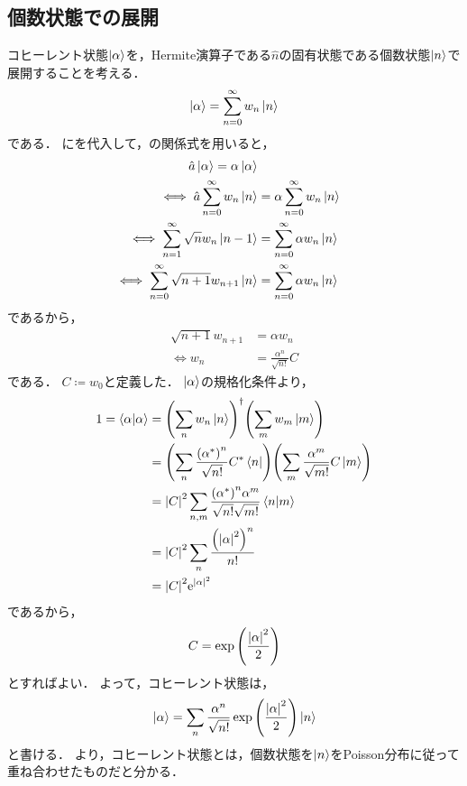 \documentclass{report}
\begin{document}
  \subsection{個数状態での展開}
    コヒーレント状態$\ket{\alpha}$を，Hermite演算子である$\hat{n}$の固有状態である個数状態$\ket{n}$で展開することを考える．
    \begin{align}
      \ket{\alpha} = \sum_{n = 0}^{\infty}w_n\ket{n}\label{coherent-expantion}
    \end{align}
    である．
    にを代入して，の関係式を用いると，
    \begin{align}
      \hat{a}\ket{\alpha} = \alpha\ket{\alpha} \\ 
      \iff \hat{a}\sum_{n = 0}^{\infty}w_n\ket{n} &= \alpha\sum_{n = 0}^{\infty}w_n\ket{n} \\ 
      \iff \sum_{n = 1}^{\infty}\sqrt{n}w_n\ket{n - 1} &= \sum_{n = 0}^{\infty}\alpha w_n\ket{n} \\ 
      \iff \sum_{n = 0}^{\infty}\sqrt{n + 1}w_{n + 1}\ket{n} &= \sum_{n = 0}^{\infty}\alpha w_n\ket{n}
    \end{align}
    であるから，
    \begin{align}
      \sqrt{n + 1}w_{n + 1} &= \alpha w_n \\ 
      \iff w_n &= \frac{\alpha^n}{\sqrt{n!}}C
    \end{align}
    である．
    $C \coloneqq w_0$と定義した．
    $\ket{\alpha}$の規格化条件より，
    \begin{align}
      1 = \braket{\alpha}{\alpha} &= \qty(\sum_{n}w_n\ket{n})^{\dag}\qty(\sum_{m}w_m\ket{m}) \\ 
      &= \qty(\sum_{n}\frac{\qty(\alpha^*)^n}{\sqrt{n!}}C^*\bra{n})\qty(\sum_{m}\frac{\alpha^m}{\sqrt{m!}}C\ket{m}) \\ 
      &= \abs{C}^2\sum_{n, m}\frac{\qty(\alpha^*)^n\alpha^m}{\sqrt{n!}\sqrt{m!}}\braket{n}{m} \\ 
      &= \abs{C}^2\sum_{n}\frac{\qty(\abs{\alpha}^2)^n}{n!} \\ 
      &= \abs{C}^2\mathrm{e}^{\abs{\alpha}^2}
    \end{align}
    であるから，
    \begin{align}
      C = \exp\qty(\frac{\abs{\alpha}^2}{2})
    \end{align}
    とすればよい．
    よって，コヒーレント状態は，
    \begin{align}
      \ket{\alpha} = \sum_n \frac{\alpha^n}{\sqrt{n!}}\exp\qty(\frac{\abs{\alpha}^2}{2})\ket{n}\label{coherent-number-state-expantion}
    \end{align}
    と書ける．
    より，コヒーレント状態とは，個数状態を$\ket{n}$をPoisson分布に従って重ね合わせたものだと分かる．
\end{document}
